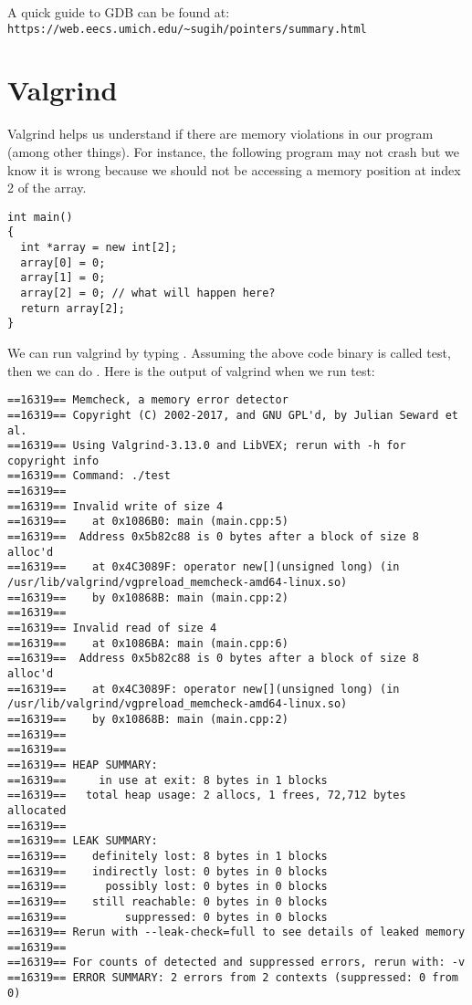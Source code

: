 \documentclass[12pt]{article}
\begin{document}
A quick guide to GDB can be found at:\\
\texttt{https://web.eecs.umich.edu/\textasciitilde{}sugih/pointers/summary.html}

\section*{Valgrind}

Valgrind helps us understand if there are memory violations in our program
(among other things). For instance, the following program may not crash but we
know it is wrong because we should not be accessing a memory position at index 2
of the array.

\begin{lstlisting}
int main()
{
  int *array = new int[2];
  array[0] = 0;
  array[1] = 0;
  array[2] = 0; // what will happen here?
  return array[2];
}
\end{lstlisting}

We can run valgrind by typing . Assuming the
above code binary is called test, then we can do . Here is the
output of valgrind when we run test:

\begin{verbatim}
==16319== Memcheck, a memory error detector
==16319== Copyright (C) 2002-2017, and GNU GPL'd, by Julian Seward et al.
==16319== Using Valgrind-3.13.0 and LibVEX; rerun with -h for copyright info
==16319== Command: ./test
==16319== 
==16319== Invalid write of size 4
==16319==    at 0x1086B0: main (main.cpp:5)
==16319==  Address 0x5b82c88 is 0 bytes after a block of size 8 alloc'd
==16319==    at 0x4C3089F: operator new[](unsigned long) (in
/usr/lib/valgrind/vgpreload_memcheck-amd64-linux.so)
==16319==    by 0x10868B: main (main.cpp:2)
==16319== 
==16319== Invalid read of size 4
==16319==    at 0x1086BA: main (main.cpp:6)
==16319==  Address 0x5b82c88 is 0 bytes after a block of size 8 alloc'd
==16319==    at 0x4C3089F: operator new[](unsigned long) (in
/usr/lib/valgrind/vgpreload_memcheck-amd64-linux.so)
==16319==    by 0x10868B: main (main.cpp:2)
==16319== 
==16319== 
==16319== HEAP SUMMARY:
==16319==     in use at exit: 8 bytes in 1 blocks
==16319==   total heap usage: 2 allocs, 1 frees, 72,712 bytes allocated
==16319== 
==16319== LEAK SUMMARY:
==16319==    definitely lost: 8 bytes in 1 blocks
==16319==    indirectly lost: 0 bytes in 0 blocks
==16319==      possibly lost: 0 bytes in 0 blocks
==16319==    still reachable: 0 bytes in 0 blocks
==16319==         suppressed: 0 bytes in 0 blocks
==16319== Rerun with --leak-check=full to see details of leaked memory
==16319== 
==16319== For counts of detected and suppressed errors, rerun with: -v
==16319== ERROR SUMMARY: 2 errors from 2 contexts (suppressed: 0 from 0)
\end{verbatim}
\end{document}
